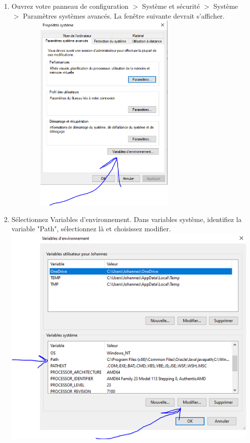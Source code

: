 \begin{enumerate}
    \item Ouvrez votre panneau de configuration $>$ Système et sécurité $>$ Système $>$ Paramètres systèmes avancés. La fenêtre suivante devrait s'afficher.\\
    \includegraphics[height = 10cm, width = 10cm]{img/Res1.PNG}
    \\
    \item Sélectionnez Variables d'environnement. Dans variables système, identifiez la variable "Path", sélectionnez là et choisissez modifier.\\
    \includegraphics[]{img/Res2.PNG}

\end{enumerate}
